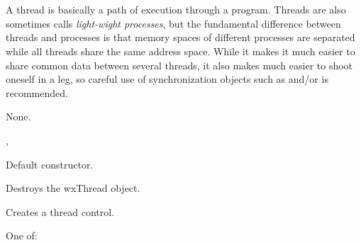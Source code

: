 \section{}\label{wxthread}

A thread is basically a path of execution through a program. Threads are also
sometimes calls {\it light-wight processes}, but the fundamental difference
between threads and processes is that memory spaces of different processes are
separated while all threads share the same address space. While it makes it
much easier to share common data between several threads, it also makes much
easier to shoot oneself in a leg, so careful use of synchronization objects
such as  and/or  is recommended.


None.


, 


\label{wxthreadconstr}


Default constructor.



Destroys the wxThread object.

\label{wxthreadcreate}


Creates a thread control.


One of:

\twocolwidtha{7cm}
\begin{twocollist}\itemsep=0pt
\end{twocollist}

\label{wxthreaddeferdestroy}


